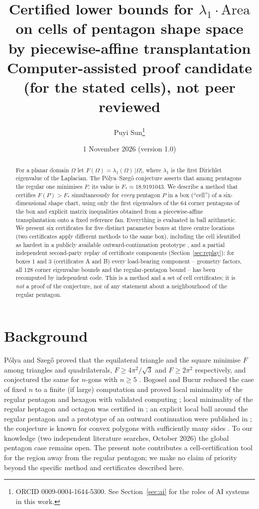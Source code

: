 \documentclass[11pt]{article}
\title{Certified lower bounds for $\lambda_1\cdot\mathrm{Area}$ on cells of pentagon shape space\\
by piecewise-affine transplantation\\[4pt]
\large Computer-assisted proof candidate (for the stated cells), not peer reviewed}
\author{Puyi Sun\thanks{ORCID 0009-0004-1644-5300. See Section~\ref{sec:ai} for the roles of AI systems in this work.}}
\date{1 November 2026 \quad (version 1.0)}
\theoremstyle{remark}
\begin{document}
\maketitle

\begin{abstract}
For a planar domain $\Omega$ let $F(\Omega)=\lambda_1(\Omega)\,|\Omega|$, where $\lambda_1$ is the first Dirichlet
eigenvalue of the Laplacian. The P\'olya--Szeg\H{o} conjecture asserts that among pentagons the regular one minimises $F$;
its value is $F_*\approx 18.9191043$. We describe a method that certifies $F(P)>F_*$ simultaneously for \emph{every}
pentagon $P$ in a box (``cell'') of a six-dimensional shape chart, using only the first eigenvalues of the $64$ corner
pentagons of the box and explicit matrix inequalities obtained from a piecewise-affine transplantation onto a fixed
reference fan. Everything is evaluated in ball arithmetic. We present six certificates for five distinct parameter boxes
at three centre locations (two certificates apply different methods to the same box), including the cell identified as
hardest in a publicly available outward-continuation prototype \cite{liu}, and a partial independent second-party replay
of certificate components (Section~\ref{sec:replay}): for boxes 1 and 3 (certificates A and B) every load-bearing component -- geometry factors, all 128 corner eigenvalue bounds and the regular-pentagon bound -- has been recomputed by independent code. This is a method and a set of cell certificates; it is \emph{not} a proof of
the conjecture, nor of any statement about a neighbourhood of the regular pentagon.
\end{abstract}

\section{Background}
P\'olya and Szeg\H{o} proved that the equilateral triangle and the square minimise $F$ among triangles and
quadrilaterals, $F\ge 4\pi^2/\sqrt3$ and $F\ge 2\pi^2$ respectively, and conjectured the same for $n$-gons with
$n\ge5$ \cite{ps}. Bogosel and Bucur reduced the case of fixed $n$ to a finite (if large) computation and proved local
minimality of the regular pentagon and hexagon with validated computing \cite{bb-jep,bb-val}; local minimality of the
regular heptagon and octagon was certified in \cite{ep}; an explicit local ball around the regular pentagon and a
prototype of an outward continuation were published in \cite{liu}; the conjecture is known for convex polygons with
sufficiently many sides \cite{cghl}. To our knowledge (two independent literature searches, October 2026) the global
pentagon case remains open. The present note contributes a cell-certification tool for the region away from the
regular pentagon; we make no claim of priority beyond the specific method and certificates described here.
\end{document}
